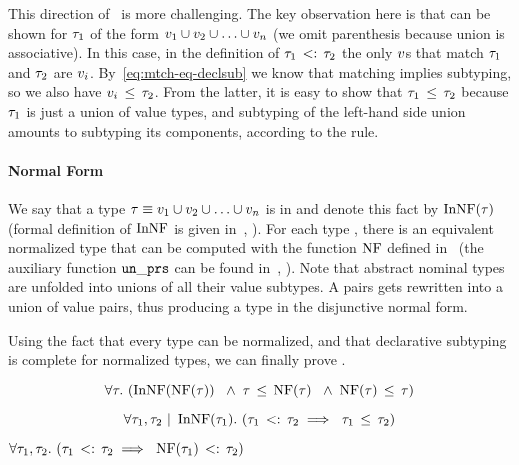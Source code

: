 This direction of~ is more challenging. 
The key observation here is that  can be shown for 
$\tau_1$ of the form $v_1 \cup v_2 \cup \ldots \cup v_n$
(we omit parenthesis because union is associative).
In this case, in the definition of $\tau_1 \, <: \, \tau_2$ the only
$v$s that match $\tau_1$ and $\tau_2$ are $v_i$. 
By~\eqref{eq:mtch-eq-declsub} we know that matching implies subtyping,
so we also have $v_i \, \leq \, \tau_2$.
From the latter, it is easy to show that $\tau_1 \, \leq \, \tau_2$ because
$\tau_1$ is just a union of value types, 
and subtyping of the left-hand side union amounts to subtyping its components,
according to the  rule.

\paragraph{Normal Form}
We say that a type $\tau \equiv v_1 \cup v_2 \cup \ldots \cup v_n$
is in  and denote this fact by $\mathop{\mathrm{InNF}}(\tau)$ 
(formal definition of $\mathop{\mathrm{InNF}}$ is given 
in~, ).
For each type \ty, there is an equivalent normalized type 
that can be computed with the function $\mathop{\mathrm{NF}}$
defined in~ (the auxiliary function $\mathop{\mathtt{un\_prs}}$ 
can be found in~, ).
Note that abstract nominal types are unfolded into unions of all their
value subtypes. A pairs gets rewritten into a union of value pairs, 
thus producing a type in the disjunctive normal form.

Using the fact that every type can be normalized,
and that declarative subtyping is complete for normalized types, 
we can finally prove .

\begin{lemma}\label{lem:declsub-nf}
\[
\forall \tau.\ (\mathop{\mathrm{InNF}}(\mathop{\mathrm{NF}}(\tau))\;\ \land\;
\tau \, \leq \, \mathop{\mathrm{NF}}(\tau)\;\ \land\; \mathop{\mathrm{NF}}(\tau) \, \leq \, \tau)
\]
\end{lemma}

\begin{lemma}
\label{lem:nf-declsub-complete}
\[
	\forall \ty_1, \ty_2 \Alt \InNF(\ty_1).\
	(\bjsemsub{\ty_1}{\ty_2} \implies\ \bjsub{\ty_1}{\ty_2})
\]
\end{lemma}

\begin{lemma}\label{lem:nf-semsub}
$
\forall \ty_1, \ty_2.\ 
(\bjsemsub{\ty_1}{\ty_2} \implies\ \bjsemsub{\NF(\ty_1)}{\ty_2})
$
\end{lemma}


